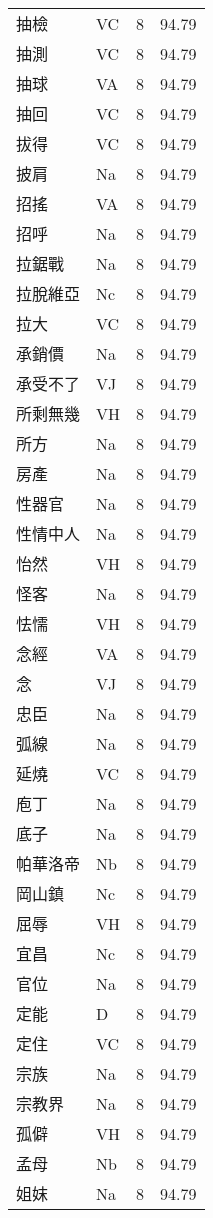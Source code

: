 \documentclass[twocolumn]{book}
\begin{document}
\begin{supertabular}{llrr}
抽檢 & VC & 8 &  94.79\\
抽測 & VC & 8 &  94.79\\
抽球 & VA & 8 &  94.79\\
抽回 & VC & 8 &  94.79\\
拔得 & VC & 8 &  94.79\\
披肩 & Na & 8 &  94.79\\
招搖 & VA & 8 &  94.79\\
招呼 & Na & 8 &  94.79\\
拉鋸戰 & Na & 8 &  94.79\\
拉脫維亞 & Nc & 8 &  94.79\\
拉大 & VC & 8 &  94.79\\
承銷價 & Na & 8 &  94.79\\
承受不了 & VJ & 8 &  94.79\\
所剩無幾 & VH & 8 &  94.79\\
所方 & Na & 8 &  94.79\\
房產 & Na & 8 &  94.79\\
性器官 & Na & 8 &  94.79\\
性情中人 & Na & 8 &  94.79\\
怡然 & VH & 8 &  94.79\\
怪客 & Na & 8 &  94.79\\
怯懦 & VH & 8 &  94.79\\
念經 & VA & 8 &  94.79\\
念 & VJ & 8 &  94.79\\
忠臣 & Na & 8 &  94.79\\
弧線 & Na & 8 &  94.79\\
延燒 & VC & 8 &  94.79\\
庖丁 & Na & 8 &  94.79\\
底子 & Na & 8 &  94.79\\
帕華洛帝 & Nb & 8 &  94.79\\
岡山鎮 & Nc & 8 &  94.79\\
屈辱 & VH & 8 &  94.79\\
宜昌 & Nc & 8 &  94.79\\
官位 & Na & 8 &  94.79\\
定能 & D & 8 &  94.79\\
定住 & VC & 8 &  94.79\\
宗族 & Na & 8 &  94.79\\
宗教界 & Na & 8 &  94.79\\
孤僻 & VH & 8 &  94.79\\
孟母 & Nb & 8 &  94.79\\
姐妺 & Na & 8 &  94.79\\

\end{supertabular}
\end{document}
